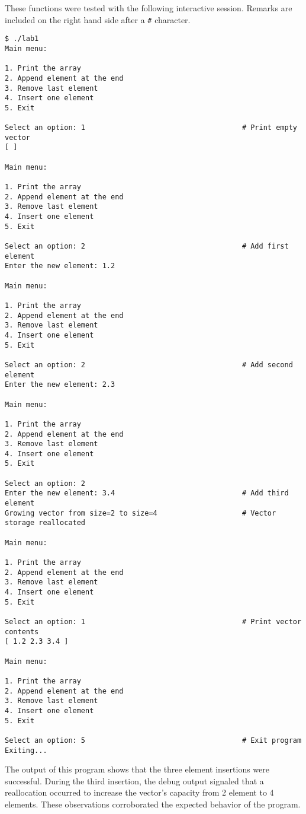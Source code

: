 \documentclass[11pt, letterpaper]{article} %
\begin{document}
These functions were tested with the following interactive session. Remarks are included on the right hand side after a \texttt{\#} character.
\begin{lstlisting}[style=labreportstyle-sh]
$ ./lab1
Main menu:

1. Print the array
2. Append element at the end
3. Remove last element
4. Insert one element
5. Exit

Select an option: 1                                     # Print empty vector
[ ]

Main menu:

1. Print the array
2. Append element at the end
3. Remove last element
4. Insert one element
5. Exit

Select an option: 2                                     # Add first element
Enter the new element: 1.2

Main menu:

1. Print the array
2. Append element at the end
3. Remove last element
4. Insert one element
5. Exit

Select an option: 2                                     # Add second element
Enter the new element: 2.3

Main menu:

1. Print the array
2. Append element at the end
3. Remove last element
4. Insert one element
5. Exit

Select an option: 2
Enter the new element: 3.4                              # Add third element
Growing vector from size=2 to size=4                    # Vector storage reallocated

Main menu:

1. Print the array
2. Append element at the end
3. Remove last element
4. Insert one element
5. Exit

Select an option: 1                                     # Print vector contents
[ 1.2 2.3 3.4 ]

Main menu:

1. Print the array
2. Append element at the end
3. Remove last element
4. Insert one element
5. Exit

Select an option: 5                                     # Exit program
Exiting...
\end{lstlisting}
The output of this program shows that the three element insertions were successful. During the third insertion, the debug output signaled that a reallocation occurred to increase the vector's capacity from 2 element to 4 elements. These observations corroborated the expected behavior of the program.
\end{document}
